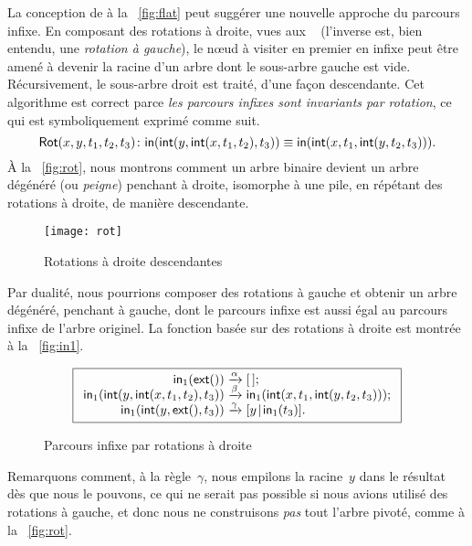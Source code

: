 La conception de
 à la
\fig~\vref{fig:flat} peut suggérer une nouvelle approche du parcours
infixe. En composant des rotations à droite, vues aux \figs~
(l'inverse est, bien entendu, une \emph{rotation à gauche}), le nœud à
visiter en premier en infixe peut être amené à devenir la racine d'un
arbre dont le sous-arbre gauche est vide. Récursivement, le sous-arbre
droit est traité, d'une façon descendante. Cet algorithme est correct
parce \emph{les parcours infixes sont invariants par rotation}, ce qui
est symboliquement exprimé comme suit.
\begin{equation*}
\pred{Rot}{x,y,t_1,t_2,t_3} \colon
\fun{in}(\fun{int}(y,\fun{int}(x,t_1,t_2),t_3))
\equiv
\fun{in}(\fun{int}(x,t_1,\fun{int}(y,t_2,t_3))).\index{in@\fun{in/1}}
\label{def:Rot}
\end{equation*}
À la \fig~\vref{fig:rot}, nous montrons comment un arbre binaire
devient un arbre dégénéré (ou
\emph{peigne}) penchant à droite, isomorphe à une pile, en répétant
des rotations à droite, de manière descendante.
\begin{figure}
\centering
\texttt{[image: rot]}
\caption{Rotations à droite descendantes}
\label{fig:rot}
\end{figure}
Par dualité, nous pourrions composer des rotations à gauche et obtenir
un arbre dégénéré, penchant à gauche, dont le parcours infixe est
aussi égal au parcours infixe de l'arbre originel. La fonction
 basée sur des rotations à
droite est montrée à la \fig~\vref{fig:in1}.
\begin{figure}
\begin{equation*}
\boxed{
\begin{array}{r@{\;}c@{\;}l}
\fun{in}_1(\fun{ext}()) & \xrightarrow{\smash{\alpha}} & \el;\\
\fun{in}_1(\fun{int}(y,\fun{int}(x,t_1,t_2),t_3))
  & \xrightarrow{\smash{\beta}} & \fun{in}_1(\fun{int}(x,t_1,\fun{int}(y,t_2,t_3)));\\
\fun{in}_1(\fun{int}(y,\fun{ext}(),t_3))
  & \xrightarrow{\smash{\gamma}} & \cons{y}{\fun{in}_1(t_3)}.
\end{array}}
\end{equation*}
\caption{Parcours infixe par rotations à droite}
\label{fig:in1}
\end{figure}
Remarquons comment, à la règle~\(\gamma\), nous empilons la
racine~\(y\) dans le résultat dès que nous le pouvons, ce qui ne
serait pas possible si nous avions utilisé des rotations à gauche, et
donc nous ne construisons \emph{pas} tout l'arbre pivoté, comme à la
\fig~\vref{fig:rot}.

